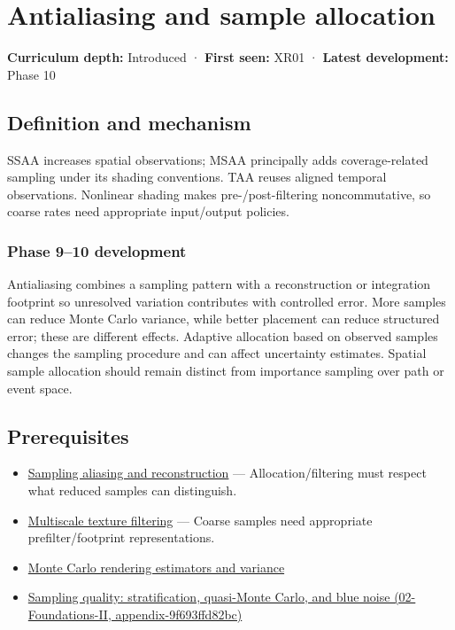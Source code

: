 \hypertarget{appendix-4192b2bdd21e}{}
\section{Antialiasing and sample allocation}\label{appendix-4192b2bdd21e-antialiasing-and-sample-allocation}

\textbf{Curriculum depth:} Introduced · \textbf{First seen:} XR01 · \textbf{Latest development:} Phase 10

\subsection{Definition and mechanism}\label{appendix-4192b2bdd21e-definition-and-mechanism}

SSAA increases spatial observations; MSAA principally adds coverage-related sampling under its shading conventions. TAA reuses aligned temporal observations. Nonlinear shading makes pre-/post-filtering noncommutative, so coarse rates need appropriate input/output policies.

\subsubsection{Phase 9--10 development}\label{appendix-4192b2bdd21e-phase-910-development}

Antialiasing combines a sampling pattern with a reconstruction or integration footprint so unresolved variation contributes with controlled error. More samples can reduce Monte Carlo variance, while better placement can reduce structured error; these are different effects. Adaptive allocation based on observed samples changes the sampling procedure and can affect uncertainty estimates. Spatial sample allocation should remain distinct from importance sampling over path or event space.

\subsection{Prerequisites}\label{appendix-4192b2bdd21e-prerequisites}

\begin{itemize}
\tightlist
\item
  \hyperref[appendix-6a7869dd79a6]{Sampling aliasing and reconstruction} --- Allocation/filtering must respect what reduced samples can distinguish.
\item
  \hyperref[appendix-b677a85ba76f]{Multiscale texture filtering} --- Coarse samples need appropriate prefilter/footprint representations.
\item
  \hyperref[appendix-031e02bf28af]{Monte Carlo rendering estimators and variance}
\item
  \href{../02-Foundations-II/main.pdf\#nameddest=appendix-9f693ffd82bc}{Sampling quality: stratification, quasi-Monte Carlo, and blue noise (02-Foundations-II, appendix-9f693ffd82bc)}
\end{itemize}

